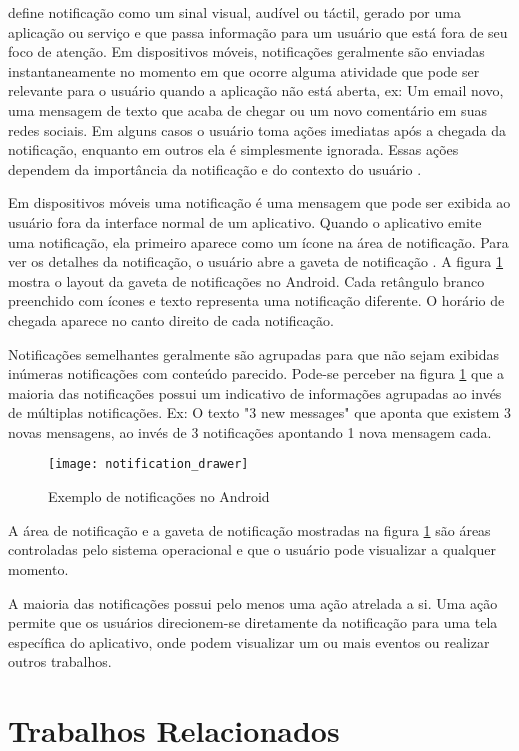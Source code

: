 \cite{iqbal2010notifications} define notificação como um sinal visual, audível ou táctil, gerado por uma aplicação
ou serviço e que passa informação para um usuário que está fora de seu foco de atenção. Em dispositivos móveis,
notificações geralmente são enviadas instantaneamente no momento em que ocorre alguma atividade que pode ser relevante
para o usuário quando a aplicação não está aberta, ex: Um email novo, uma mensagem de texto que acaba de chegar ou um
novo comentário em suas redes sociais. Em alguns casos o usuário toma ações imediatas após a chegada da notificação,
enquanto em outros ela é simplesmente ignorada. Essas ações dependem da importância da notificação e do contexto do
usuário \cite{sahami2014large}.

Em dispositivos móveis uma notificação é uma mensagem que pode ser exibida ao usuário fora da interface normal de um aplicativo.
Quando o aplicativo emite uma notificação, ela primeiro aparece como um ícone na área de notificação. Para ver os detalhes da
notificação, o usuário abre a gaveta de notificação \cite{notificationDrawer}. A figura \ref{notification-drawer} mostra
o layout da gaveta de notificações no Android. Cada retângulo branco preenchido com ícones e texto representa uma notificação
diferente. O horário de chegada aparece no canto direito de cada notificação.

Notificações semelhantes geralmente são agrupadas para que não sejam exibidas inúmeras notificações com conteúdo parecido.
Pode-se perceber na figura \ref{notification-drawer} que a maioria das notificações possui um indicativo de informações agrupadas
ao invés de múltiplas notificações. Ex: O texto "3 new messages" que aponta que existem 3 novas mensagens, ao invés de 3
notificações apontando 1 nova mensagem cada.

\begin{figure}[h]
\centering
\texttt{[image: notification\_drawer]}
\caption{Exemplo de notificações no Android \cite{notificationDrawer}}
\label{notification-drawer}
\end{figure}

A área de notificação e a gaveta de notificação mostradas na figura \ref{notification-drawer} são áreas controladas pelo
sistema operacional e que o usuário pode visualizar a qualquer momento.

A maioria das notificações possui pelo menos uma ação atrelada a si. Uma ação permite que os usuários direcionem-se
diretamente da notificação para uma tela específica do aplicativo, onde podem visualizar um ou mais eventos ou realizar outros trabalhos.

\section{Trabalhos Relacionados}
\label{trabalhos-relacionados}

\cite{chun2017exploring}
